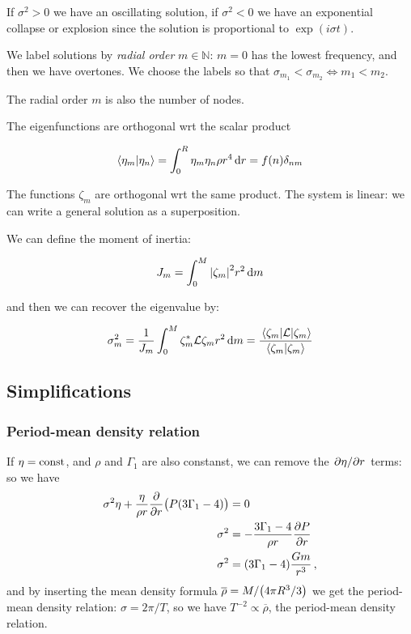 \documentclass[main.tex]{subfiles}
\begin{document}
If \(\sigma^2 > 0\) we have an oscillating solution, if \(\sigma^2 <0 \) we have an exponential collapse or explosion since the solution is proportional to \(\exp(i \sigma t)\).

We label solutions by \emph{radial order} \(m \in \mathbb{N}\): \(m=0\) has the lowest frequency, and then we have overtones.
We choose the labels so that \(\sigma_{m_1} < \sigma_{m_2} \iff m_1 < m_2\).

The radial order \(m\) is also the number of nodes.

The eigenfunctions are orthogonal wrt the scalar product

\begin{equation}
  \braket{\eta_m}{\eta_n} = \int _{0}   ^{R} \eta_m \eta_n \rho r^4 \dd{r} = f(n) \delta_{nm}
\end{equation}


The functions \(\zeta_m\) are orthogonal wrt the same product. The system is linear: we can write a general solution as a superposition.

We can define the moment of inertia:

\begin{equation}
  J_m = \int _{0}   ^{M} \abs{\zeta_m}^2 r^2 \dd{m}
\end{equation}

and then we can recover the eigenvalue by:

\begin{equation}
  \sigma_m^2 = \frac{1}{J_m} \int_0^M \zeta_m ^* \mathcal L \zeta_m r^2 \dd{m}
  = \frac{\ev{\mathcal{L}}{\zeta_{m}}}{\braket{\zeta_{m}}{\zeta_{m}}}
\end{equation}

\subsection{Simplifications}

\subsubsection{Period-mean density relation}

If \(\eta = \text{const}\), and \(\rho \) and \(\Gamma_1\) are also constanst, we can remove the \(\pdv*{\eta }{r}\) terms: so we have 
%
\begin{align}
\sigma^2 \eta + \frac{\eta }{\rho r} \pdv{}{r} \qty(P \qty(3 \Gamma_1 - 4)) &= 0  \\
\sigma^2 &= - \frac{3 \Gamma_1 - 4}{\rho r} \pdv{P}{r}  \\
\sigma^2 &= \qty( 3\Gamma_1 -4 ) \frac{Gm}{r^3}
\,,
\end{align}
%
and by inserting the mean density formula \(\overline{\rho} = M / \qty(4 \pi R^3 / 3)\) we get the period-mean density relation: \(\sigma = 2 \pi / T\), so we have \(T^{-2} \propto \overline{\rho}\), the period-mean density relation. 
\end{document}
